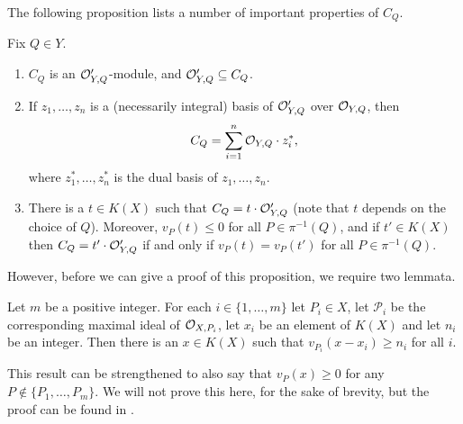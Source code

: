 The following proposition lists a number of important properties of $C_Q$.

\begin{prop}\label{propfactsaboutc'}
    Fix $Q\in Y$. 
        \begin{enumerate}
        \item $C_Q$ is an ${\cal O}_{Y,Q}'$-module, and ${\cal O}_{Y,Q}' \subseteq C_Q$.
        \item If $z_1,\ldots ,z_n$ is a (necessarily integral) basis of ${\cal O}_{Y,Q}'$ over ${\cal O}_{Y,Q}$, then 
        \[
        C_Q = \sum_{i=1}^n {\cal O}_{Y,Q}\cdot z_i^*,
        \]
        where $z_1^*, \ldots, z_n^*$ is the dual basis of $z_1, \ldots, z_n$.
        \item There is a $t\in K(X)$ such that $C_Q = t\cdot {\cal O}_{Y,Q}'$ (note that $t$ depends on the choice of $Q$).
        Moreover, $v_P(t) \leq 0$ for all $P\in \pi^{-1}(Q)$, and if $t'\in K(X)$ then $C_Q=t'\cdot {\cal O}_{Y,Q}'$ if and only if $v_P(t) = v_P(t')$ for all $P\in \pi^{-1}(Q)$.
        \end{enumerate}
    \end{prop}

However, before we can give a proof of this proposition, we require two lemmata.

    \begin{lem}\label{lemmaapproximationlemma}
    Let $m$ be a positive integer. 
    For each $i\in \{1,\ldots, m\}$ let $P_i\in X$, let $\mathcal{P}_i$ be the corresponding maximal ideal of ${\cal O}_{X,P_i}$, let $x_i$ be an element of $K(X)$ and let $n_i$ be an integer.
    Then there is an $x\in K(X)$ such that $v_{P_i}(x-x_i) \geq n_i$ for all $i$.
    \end{lem}
    
    \begin{rem}
    This result can be strengthened to also say that $v_P(x) \geq 0$ for any $P\notin \{P_1,\ldots ,P_m\}$.
    We will not prove this here, for the sake of brevity, but the proof can be found in \cite[Chap. 1, \S 3, pg. 12]{localfields}.
    \end{rem}

